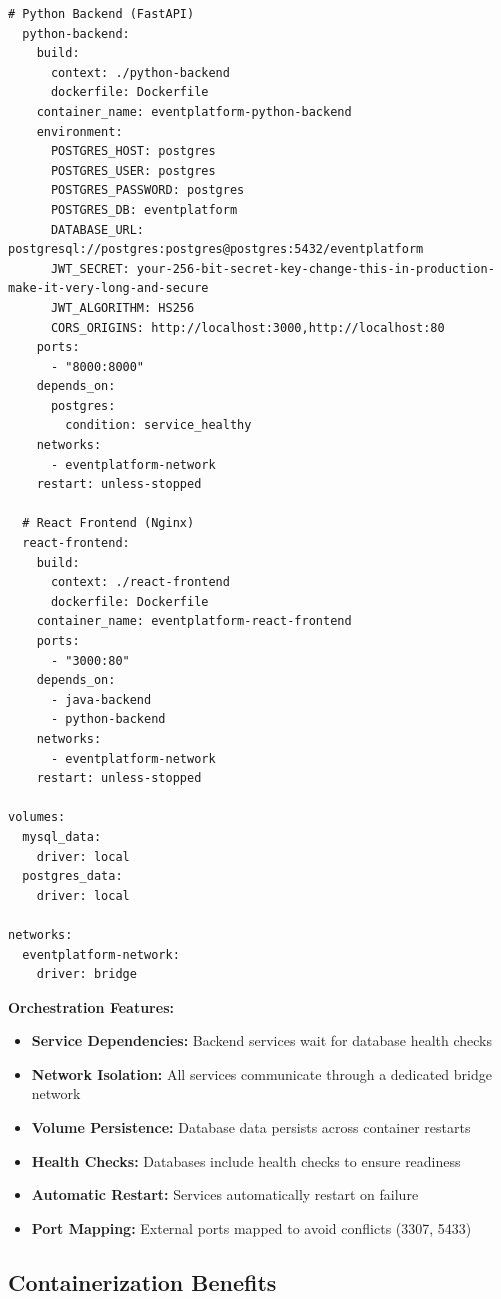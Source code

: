 \documentclass[12pt,a4paper]{article}
\begin{document}
\begin{lstlisting}[style=yaml, caption={docker-compose.yml}, label={lst:docker-compose}]
  # Python Backend (FastAPI)
  python-backend:
    build:
      context: ./python-backend
      dockerfile: Dockerfile
    container_name: eventplatform-python-backend
    environment:
      POSTGRES_HOST: postgres
      POSTGRES_USER: postgres
      POSTGRES_PASSWORD: postgres
      POSTGRES_DB: eventplatform
      DATABASE_URL: postgresql://postgres:postgres@postgres:5432/eventplatform
      JWT_SECRET: your-256-bit-secret-key-change-this-in-production-make-it-very-long-and-secure
      JWT_ALGORITHM: HS256
      CORS_ORIGINS: http://localhost:3000,http://localhost:80
    ports:
      - "8000:8000"
    depends_on:
      postgres:
        condition: service_healthy
    networks:
      - eventplatform-network
    restart: unless-stopped

  # React Frontend (Nginx)
  react-frontend:
    build:
      context: ./react-frontend
      dockerfile: Dockerfile
    container_name: eventplatform-react-frontend
    ports:
      - "3000:80"
    depends_on:
      - java-backend
      - python-backend
    networks:
      - eventplatform-network
    restart: unless-stopped

volumes:
  mysql_data:
    driver: local
  postgres_data:
    driver: local

networks:
  eventplatform-network:
    driver: bridge
\end{lstlisting}

\textbf{Orchestration Features:}
\begin{itemize}
    \item \textbf{Service Dependencies:} Backend services wait for database health checks
    \item \textbf{Network Isolation:} All services communicate through a dedicated bridge network
    \item \textbf{Volume Persistence:} Database data persists across container restarts
    \item \textbf{Health Checks:} Databases include health checks to ensure readiness
    \item \textbf{Automatic Restart:} Services automatically restart on failure
    \item \textbf{Port Mapping:} External ports mapped to avoid conflicts (3307, 5433)
\end{itemize}

\subsection{Containerization Benefits}
\end{document}
